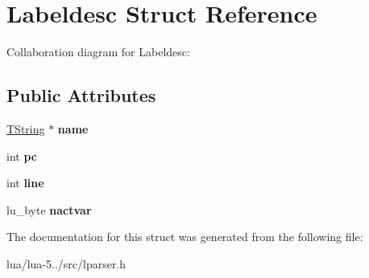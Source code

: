 \hypertarget{struct_labeldesc}{\section{Labeldesc Struct Reference}
\label{struct_labeldesc}
}


Collaboration diagram for Labeldesc\+:
\subsection*{Public Attributes}
\begin{DoxyCompactItemize}
\item 
\hypertarget{struct_labeldesc_adb07dc226860577090f82586ebfebd81}{\hyperlink{union_t_string}{T\+String} $\ast$ {\bfseries name}}\label{struct_labeldesc_adb07dc226860577090f82586ebfebd81}

\item 
\hypertarget{struct_labeldesc_a0383e9e85c343a50a9c6250596e5347f}{int {\bfseries pc}}\label{struct_labeldesc_a0383e9e85c343a50a9c6250596e5347f}

\item 
\hypertarget{struct_labeldesc_ac180e0f26c94e5094956f2b69c0e2b1f}{int {\bfseries line}}\label{struct_labeldesc_ac180e0f26c94e5094956f2b69c0e2b1f}

\item 
\hypertarget{struct_labeldesc_a472fa008a98c95083e6e2db4b66e28e4}{lu\+\_\+byte {\bfseries nactvar}}\label{struct_labeldesc_a472fa008a98c95083e6e2db4b66e28e4}

\end{DoxyCompactItemize}


The documentation for this struct was generated from the following file\+:\begin{DoxyCompactItemize}
\item 
lua/lua-\/5../src/lparser.\+h\end{DoxyCompactItemize}
